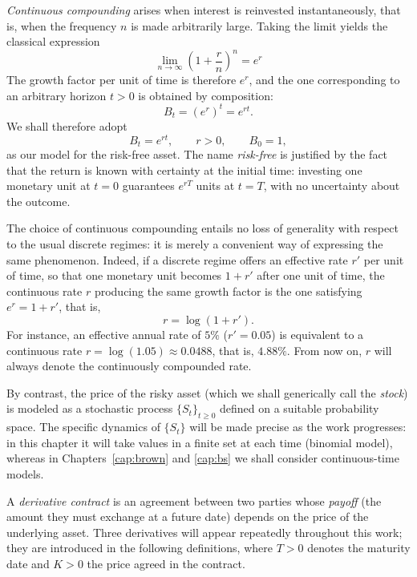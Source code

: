 \documentclass[11pt,a4paper,oneside]{report}
\theoremstyle{plain}
\theoremstyle{definition}
\theoremstyle{remark}
\newcommand{\1}{\mathbf{1}}
\begin{document}
\emph{Continuous compounding} arises when interest is reinvested
instantaneously, that is, when the frequency $n$ is made arbitrarily
large. Taking the limit yields the classical expression
\begin{equation}\label{eq:limite_e}
  \lim_{n \to \infty}\left(1 + \frac{r}{n}\right)^{n} = e^{r}
\end{equation}
The growth factor per unit of time is therefore $e^{r}$, and the one
corresponding to an arbitrary horizon $t > 0$ is obtained by
composition:
\begin{equation*}
  B_t = \left(e^{r}\right)^{t} = e^{rt}.
\end{equation*}
We shall therefore adopt
\begin{equation}\label{eq:bono}
  B_t = e^{rt}, \qquad r > 0, \qquad B_0 = 1,
\end{equation}
as our model for the risk-free asset. The name \emph{risk-free} is
justified by the fact that the return is known with certainty at the
initial time: investing one monetary unit at $t = 0$ guarantees
$e^{rT}$ units at $t = T$, with no uncertainty about the outcome.

The choice of continuous compounding entails no loss of generality
with respect to the usual discrete regimes: it is merely a convenient
way of expressing the same phenomenon. Indeed, if a discrete regime
offers an effective rate $r'$ per unit of time, so that one monetary
unit becomes $1 + r'$ after one unit of time, the continuous rate $r$
producing the same growth factor is the one satisfying
$e^{r} = 1 + r'$, that is,
\begin{equation*}
  r = \log(1 + r').
\end{equation*}
For instance, an effective annual rate of $5\%$ ($r' = 0.05$) is
equivalent to a continuous rate $r = \log(1.05) \approx 0.0488$, that
is, $4.88\%$. From now on, $r$ will always denote the continuously
compounded rate.

By contrast, the price of the risky
asset (which we shall generically call the \emph{stock}) is modeled as
a stochastic process $\{S_t\}_{t \geq 0}$ defined on a suitable
probability space. The specific dynamics of $\{S_t\}$ will be made
precise as the work progresses: in this chapter it will take values in
a finite set at each time (binomial model), whereas in
Chapters~\ref{cap:brown} and \ref{cap:bs} we shall consider
continuous-time models.

A \emph{derivative contract}
is an agreement between two parties whose \emph{payoff} (the amount
they must exchange at a future date) depends on the price of the
underlying asset. Three derivatives will appear repeatedly throughout
this work; they are introduced in the following definitions, where
$T > 0$ denotes the maturity date and $K > 0$ the price agreed in the
contract.
\end{document}
